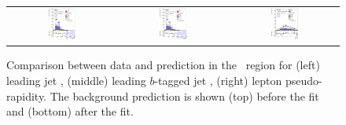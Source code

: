 \begin{figure}[tp]
\begin{tabular}{ccc}
  \includegraphics[width=0.27\textwidth]{Analysis/Figures_ttH/tesis_vars/postfit/jet1_pt_4jetex4btagin.eps} &
  \includegraphics[width=0.27\textwidth]{Analysis/Figures_ttH/tesis_vars/postfit/bjet1_pt_4jetex4btagin.eps} &
  \includegraphics[width=0.27\textwidth]{Analysis/Figures_ttH/tesis_vars/postfit/lep_eta_4jetex4btagin.eps} \\
\end{tabular}
\caption{Comparison between data and prediction in the \fourfour\ region for (left) leading jet \pt, (middle) leading $b$-tagged jet \pt, (right) lepton pseudo-rapidity. The background prediction is shown (top) before the fit and (bottom) after the fit.}
  \label{fig:vars2_fourfour}
\end{figure}

